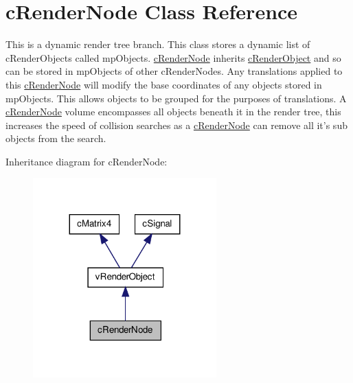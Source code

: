\hypertarget{classc_render_node}{
\section{cRenderNode Class Reference}
\label{classc_render_node}
}


This is a dynamic render tree branch. This class stores a dynamic list of cRenderObjects called mpObjects. \hyperlink{classc_render_node}{cRenderNode} inherits \hyperlink{classc_render_object}{cRenderObject} and so can be stored in mpObjects of other cRenderNodes. Any translations applied to this \hyperlink{classc_render_node}{cRenderNode} will modify the base coordinates of any objects stored in mpObjects. This allows objects to be grouped for the purposes of translations. A \hyperlink{classc_render_node}{cRenderNode} volume encompasses all objects beneath it in the render tree, this increases the speed of collision searches as a \hyperlink{classc_render_node}{cRenderNode} can remove all it's sub objects from the search.  




Inheritance diagram for cRenderNode:
\nopagebreak
\begin{figure}[H]
\begin{center}
\leavevmode
\includegraphics[width=200pt]{classc_render_node__inherit__graph}
\end{center}
\end{figure}


